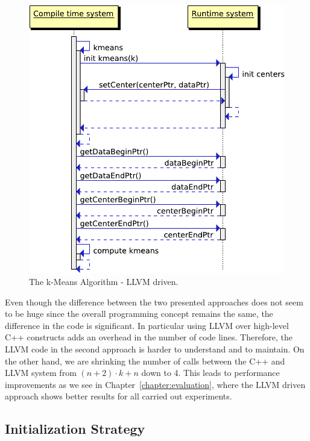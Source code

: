 \begin{figure}[htsb]
  \centering
  \includegraphics[scale=0.55]{figures/llvm_driven}
  \caption[The k-Means Algorithm - LLVM driven]{The k-Means Algorithm - LLVM driven.}
  \label{fig:llvm_driven}
\end{figure}



Even though the difference between the two presented approaches does not seem to be huge since the overall programming concept remains the same, the difference in the code is significant. In particular using LLVM over high-level C++ constructs adds an overhead in the number of code lines. Therefore, the LLVM code in the second approach is harder to understand and to maintain. On the other hand, we are shrinking the number of calls between the C++ and LLVM system from $(n + 2) \cdot k + n$ down to 4. This leads to performance improvements as we see in Chapter~\ref{chapter:evaluation}, where the LLVM driven approach shows better results for all carried out experiments.


\subsection{Initialization Strategy}\label{sub:init}

